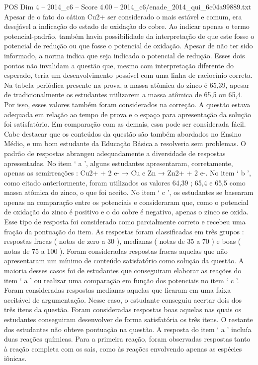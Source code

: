 \begin{textsample}{POS Dim 4 – 2014\_c6 – Score 4.00 – 2014\_c6/enade\_2014\_qui\_6c04a99889.txt}
Apesar de o fato do cátion Cu2+ ser considerado o mais estável e comum, era desejável a indicação do estado de oxidação do cobre.
Ao indicar apenas o termo potencial-padrão, também havia possibilidade da interpretação de que este fosse o potencial de redução ou que fosse o potencial de oxidação.
Apesar de não ter sido informado, a norma indica que seja indicado o potencial de redução.
Esses dois pontos não invalidam a questão que, mesmo com interpretação diferente do esperado, teria um desenvolvimento possível com uma linha de raciocínio correta.
Na tabela periódica presente na prova, a massa atômica do zinco é 65,39, apesar de tradicionalmente os estudantes utilizarem a massa atômica de 65,5 ou 65,4.
Por isso, esses valores também foram considerados na correção.
A questão estava adequada em relação ao tempo de prova e o espaço para apresentação da solução foi satisfatório.
Em comparação com as demais, essa pode ser considerada fácil.
Cabe destacar que os conteúdos da questão são também abordados no Ensino Médio, e um bom estudante da Educação Básica a resolveria sem problemas.
O padrão de respostas abrangeu adequadamente a diversidade de respostas apresentadas.
No item ‘ a ’, alguns estudantes apresentaram, corretamente, apenas as semirreações : Cu2+ + 2 e- → Cu e Zn → Zn2+ + 2 e-.
No item ‘ b ’, como citado anteriormente, foram utilizados os valores 64,39 ; 65,4 e 65,5 como massa atômica do zinco, o que foi aceito.
No item ‘ c ’, os estudantes se basearam apenas na comparação entre os potenciais e consideraram que, como o potencial de oxidação do zinco é positivo e o do cobre é negativo, apenas o zinco se oxida.
Esse tipo de resposta foi considerado como parcialmente correto e recebeu uma fração da pontuação do item.
As respostas foram classificadas em três grupos : respostas fracas ( notas de zero a 30 ), medianas ( notas de 35 a 70 ) e boas ( notas de 75 a 100 ).
Foram consideradas respostas fracas aquelas que não apresentaram um mínimo de conteúdo satisfatório como solução da questão.
A maioria desses casos foi de estudantes que conseguiram elaborar as reações do item ‘ a ’ ou realizar uma comparação em função dos potenciais no item ‘ c ’.
Foram consideradas respostas medianas aquelas que ficaram em uma faixa aceitável de argumentação.
Nesse caso, o estudante conseguiu acertar dois dos três itens da questão.
Foram consideradas respostas boas aquelas nas quais os estudantes conseguiram desenvolver de forma satisfatória os três itens.
O restante dos estudantes não obteve pontuação na questão.
A resposta do item ‘ a ’ incluía duas reações químicas.
Para a primeira reação, foram observadas respostas tanto à reação completa com os sais, como às reações envolvendo apenas as espécies iônicas.

\end{textsample}
